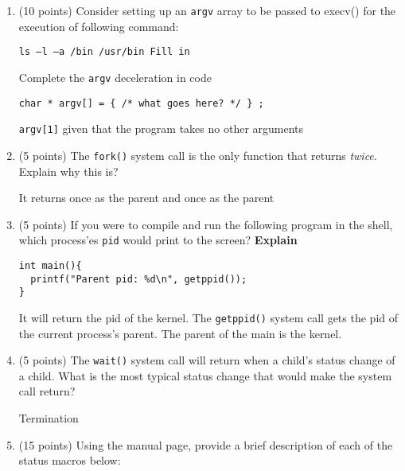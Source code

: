 \documentclass{article}[9pt]
\newenvironment{answerfont}{\fontfamily{qhv}\selectfont}{\par}
\newenvironment{myanswer}{\begin{mdframed}\begin{answerfont}}{\end{answerfont}\end{mdframed}}
\begin{document}
\begin{enumerate}
\item (10 points) Consider setting up an \texttt{argv} array to be passed to execv() for
the execution of following command: 

\begin{verbatim}
ls –l –a /bin /usr/bin Fill in
\end{verbatim}

Complete the \texttt{argv} deceleration in code

\begin{verbatim}
char * argv[] = { /* what goes here? */ } ;
\end{verbatim}

  \begin{myanswer}
    \texttt{argv[1]} given that the program takes no other arguments
  \end{myanswer}

\item (5 points) The \texttt{fork()} system call is the only function that returns
\emph{twice}. Explain why this is?

  \begin{myanswer}
    It returns once as the parent and once as the parent
  \end{myanswer}

\item (5 points) If you were to compile and run the following program in the
shell, which process'es \texttt{pid} would print to the screen?
\textbf{Explain}

\begin{verbatim}
int main(){
  printf("Parent pid: %d\n", getppid());
}
\end{verbatim}

  \begin{myanswer}
    It will return the pid of the kernel.  The \texttt{getppid()} system
    call gets the pid of the current process's parent.  The parent of
    the main is the kernel.
  \end{myanswer}

  
\item (5 points) The \texttt{wait()} system call will return when a child's status change
of a child. What is the most typical status change that would
make the system call return?

  \begin{myanswer}
    Termination
  \end{myanswer}

\item (15 points) Using the manual page, provide a brief description of each of
the status macros below:



\end{enumerate}
\end{document}
